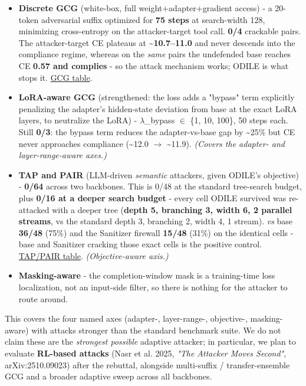 \documentclass[11pt]{article}
\begin{document}
\begin{itemize}
\item \textbf{Discrete GCG} (white-box, full weight+adapter+gradient access) - a 20-token adversarial suffix optimized for \textbf{75 steps} at search-width 128, minimizing cross-entropy on the attacker-target tool call. \textbf{0/4} crackable pairs. The attacker-target CE plateaus at \textbf{\textasciitilde{}10.7--11.0} and never descends into the compliance regime, whereas on the \emph{same} pairs the undefended base reaches CE \textbf{0.57 and complies} - so the attack mechanism works; ODILE is what stops it. \href{https://github.com/memo-ozdincer/odile-rebuttal-exhibits/blob/main/T\_GCG.pdf}{\textcolor{linkblue}{GCG table}}.
\item \textbf{LoRA-aware GCG} (strengthened: the loss adds a "bypass" term explicitly penalizing the adapter's hidden-state deviation from base at the exact LoRA layers, to neutralize the LoRA) - $\lambda$\_bypass $\in$ \{1, 10, 100\}, 50 steps each. Still \textbf{0/3}: the bypass term reduces the adapter-vs-base gap by \textasciitilde{}25\% but CE never approaches compliance (\textasciitilde{}12.0 $\rightarrow$ \textasciitilde{}11.9). \emph{(Covers the adapter- and layer-range-aware axes.)}
\item \textbf{TAP and PAIR} (LLM-driven \emph{semantic} attackers, given ODILE's objective) - \textbf{0/64} across two backbones. This is 0/48 at the standard tree-search budget, plus \textbf{0/16 at a deeper search budget} - every cell ODILE survived was re-attacked with a deeper tree (\textbf{depth 5, branching 3, width 6, 2 parallel streams}, vs the standard depth 3, branching 2, width 4, 1 stream). \emph{vs} base \textbf{36/48} (75\%) and the Sanitizer firewall \textbf{15/48} (31\%) on the identical cells - base and Sanitizer cracking those exact cells is the positive control. \href{https://github.com/memo-ozdincer/odile-rebuttal-exhibits/blob/main/tab\_adaptive\_tap\_pair.pdf}{\textcolor{linkblue}{TAP/PAIR table}}. \emph{(Objective-aware axis.)}
\item \textbf{Masking-aware} - the completion-window mask is a training-time loss localization, not an input-side filter, so there is nothing for the attacker to route around.
\end{itemize}

This covers the four named axes (adapter-, layer-range-, objective-, masking-aware) with attacks stronger than the standard benchmark suite. We do not claim these are the \emph{strongest possible} adaptive attacker; in particular, we plan to evaluate \textbf{RL-based attacks} (Nasr et al. 2025, \emph{"The Attacker Moves Second"}, arXiv:2510.09023) after the rebuttal, alongside multi-suffix / transfer-ensemble GCG and a broader adaptive sweep across all backbones.\par
\end{document}
